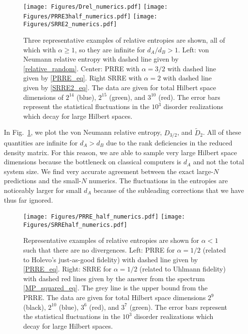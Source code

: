 \documentclass[a4paper,11pt]{article}
\begin{document}
\begin{figure}
    \centering
    \texttt{[image: Figures/Drel\_numerics.pdf]}
    \texttt{[image: Figures/PRRE3half\_numerics.pdf]}
    \texttt{[image: Figures/SRRE2\_numerics.pdf]}
    \caption{Three representative examples of relative entropies are shown, all of which with $\alpha \geq 1$, so they are infinite for $d_A/d_B > 1$. Left: von Neumann relative entropy with dashed line given by \eqref{relative_random}. Center: PRRE with $\alpha = 3/2$ with dashed line given by \eqref{PRRE_eq}. Right SRRE with $\alpha = 2$ with dashed line given by \eqref{SRRE2_eq}. The data are given for total Hilbert space dimensions of $2^{14}$ (blue), $2^{15}$ (green), and $3^{10}$ (red). The error bars represent the statistical fluctuations in the $10^3$ disorder realizations which decay for large Hilbert spaces.}
    \label{relative_entropy_numerics}
\end{figure}



In Fig.~\ref{relative_entropy_numerics}, we plot the von Neumann relative entropy, $D_{3/2}$, and $\tilde{D}_2$. All of these quantities are infinite for $d_A > d_B$ due to the rank deficiencies in the reduced density matrix. For this reason, we are able to sample very large Hilbert space dimensions because the bottleneck on classical computers is $d_A$ and not the total system size. We find very accurate agreement between the exact large-$N$ predictions and the small-$N$ numerics. The fluctuations in the entropies are noticeably larger for small $d_A$ because of the subleading corrections that we have thus far ignored.


\begin{figure}
    \centering
    \texttt{[image: Figures/PRRE\_half\_numerics.pdf]}
    \texttt{[image: Figures/SRREhalf\_numerics.pdf]}
    \caption{Representative examples of relative entropies are shown for $\alpha < 1$ such that there are no divergences. Left: PRRE for $\alpha = 1/2$ (related to Holevo's just-as-good fidelity) with dashed line given by \eqref{PRRE_eq}. Right: SRRE for $\alpha = 1/2$ (related to Uhlmann fidelity) with dashed red lines given by the answer from the spectrum \eqref{MP_squared_eq}. The grey line is the upper bound from the PRRE. The data are given for total Hilbert space dimensions $2^9$ (black), $2^{10}$ (blue), $3^6$ (red), and $3^7$ (green). The error bars represent the statistical fluctuations in the $10^3$ disorder realizations which decay for large Hilbert spaces. }
    \label{REhalf_numerics}
\end{figure}
\end{document}
